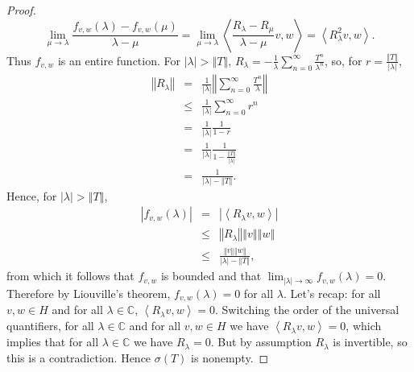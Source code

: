 \documentclass{article}
\newcommand{\inner}[2]{\left\langle #1, #2 \right\rangle}
\newcommand{\norm}[1]{\left\Vert #1 \right\Vert}
\begin{document}
\begin{proof}
\[
\lim_{\mu \to \lambda} \frac{f_{v,w}(\lambda)-f_{v,w}(\mu)}{\lambda-\mu}=\lim_{\mu \to \lambda} \inner{\frac{R_\lambda  -R_\mu}{\lambda-\mu} v}{w}
=\inner{R_\lambda^2 v}{w}.
\]
Thus $f_{v,w}$ is an entire function. 
For $|\lambda| > \norm{T}$, $R_\lambda=-\frac{1}{\lambda} \sum_{n=0}^\infty \frac{T^n}{\lambda^n}$, so, for $r=\frac{\norm{T}}{|\lambda|}$,
\begin{eqnarray*}
\norm{R_\lambda}&=&\frac{1}{|\lambda|} \norm{ \sum_{n=0}^\infty \frac{T^n}{\lambda}}\\
&\leq&\frac{1}{|\lambda|} \sum_{n=0}^\infty r^n\\
&=&\frac{1}{|\lambda|} \frac{1}{1-r}\\
&=&\frac{1}{|\lambda|} \frac{1}{1-\frac{\norm{T}}{|\lambda|}}\\
&=&\frac{1}{|\lambda|-\norm{T}}.
\end{eqnarray*}
Hence, for $|\lambda| > \norm{T}$,
\begin{eqnarray*}
|f_{v,w}(\lambda)|&=&|\inner{R_\lambda v}{w}|\\
&\leq&\norm{R_\lambda} \norm{v} \norm{w}\\
&\leq&\frac{ \norm{v} \norm{w}}{|\lambda|-\norm{T}},
\end{eqnarray*}
from which it follows that $f_{v,w}$ is bounded and that $\lim_{|\lambda| \to \infty} f_{v,w}(\lambda)=0$. Therefore by Liouville's theorem, $f_{v,w}(\lambda)=0$ for all
$\lambda$. Let's recap: for all $v,w \in H$ and for all $\lambda \in \mathbb{C}$, $\inner{R_\lambda v}{w}=0$. Switching the order of the universal quantifiers, 
for all $\lambda \in \mathbb{C}$ and  for all $v,w \in H$  we have $\inner{R_\lambda v}{w}=0$, which implies that for all $\lambda \in
\mathbb{C}$ we have $R_\lambda=0$. But by assumption $R_\lambda$ is invertible, so this is a contradiction.  Hence $\sigma(T)$ is  nonempty.
\end{proof}
\end{document}
